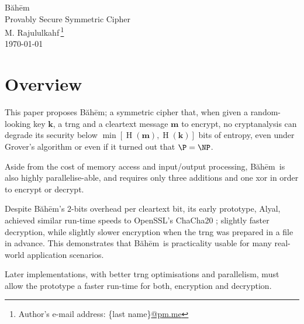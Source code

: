 \documentclass[twocolumn,hidelinks]{article}
\newcommand{\baheem}{Băhēm}
\newcommand{\alyal}{Alyal}
\DeclareMathOperator{\entropy}{H}
\begin{document}
\begin{center}
    \Huge
    \baheem\\
    \Large
    Provably Secure Symmetric Cipher\\
    \normalsize
    \vspace{0.5em}
    M. Rajululkahf\,\footnote{Author's e-mail address: \{last
    name\}\url{@pm.me}}\\
    \vspace{0.5em}
    \footnotesize
    \today\\
\end{center}

\section*{Overview}
This paper proposes \baheem;  a symmetric cipher that, when given a
random-looking key $\mathbf{k}$, a \gls{trng} and a cleartext message
$\mathbf{m}$ to encrypt, no cryptanalysis can degrade its security below
$\min[\entropy(\mathbf{m}), \entropy(\mathbf{k})]$ bits of entropy, even
under Grover's algorithm \cite{10.1145/237814.237866} or even if it turned
out that $\P = \NP$.

Aside from the cost of memory access and input/output processing, \baheem\
is also highly parallelise-able, and requires only three additions and one
\gls{xor} in order to encrypt or decrypt.

Despite \baheem's $2$-bits overhead per cleartext bit, its early prototype,
\alyal, achieved similar run-time speeds to OpenSSL's ChaCha20
\cite{chacha20}; slightly faster decryption, while slightly slower
encryption when the \gls{trng} was prepared in a file in advance.  This
demonstrates that \baheem\ is practicality usable for many real-world
application scenarios.

Later implementations, with better \gls{trng} optimisations and
parallelism, must allow the prototype a faster run-time for both,
encryption and decryption.
\end{document}
